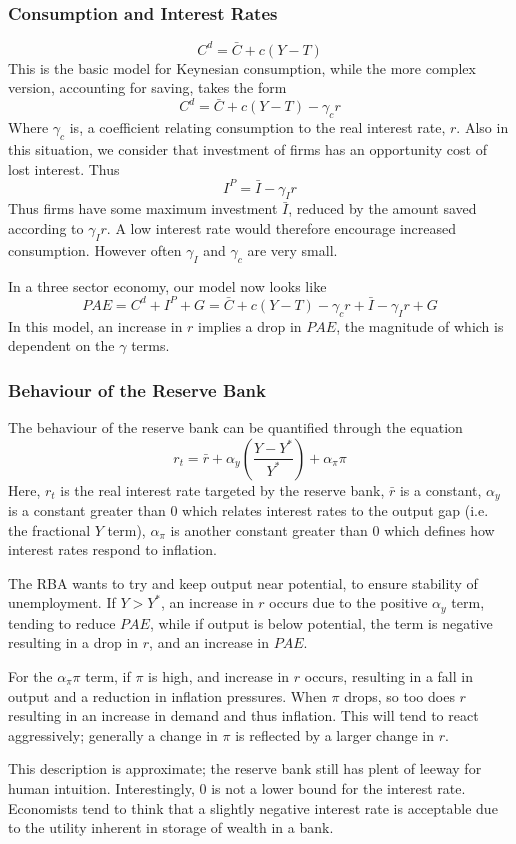 \documentclass[12pt]{report}
\begin{document}
\begin{flushleft}
\subsubsection*{Consumption and Interest Rates}

\[C^d = \bar{C} + c(Y - T)\]
This is the basic model for Keynesian consumption, while the more complex
version, accounting for saving, takes the form
\[C^d = \bar{C} + c(Y - T) - \gamma_cr\]
Where \(\gamma_c\) is, a coefficient relating consumption to the
real interest rate, \(r\). Also in this situation, we consider that investment
of firms has an opportunity cost of lost interest. Thus
\[I^P = \bar{I} - \gamma_Ir\]
Thus firms have some maximum investment \(\bar{I}\), reduced by the amount
saved according to \(\gamma_Ir\). A low interest rate would therefore encourage
increased consumption. However often \(\gamma_I\) and \(\gamma_c\) are very
small. \par
In a three sector economy, our model now looks like
\[PAE = C^d + I^P + G =\bar{C} + c(Y - T) -\gamma_cr + \bar{I} -\gamma_Ir + G\] 
In this model, an increase in \(r\) implies a drop in \(PAE\), the magnitude of
which is dependent on the \(\gamma\) terms.

\subsubsection*{Behaviour of the Reserve Bank}

The behaviour of the reserve bank can be quantified through the equation
\[r_t = \bar{r} + \alpha_y\left(\frac{Y - Y^*}{Y^*}\right) + \alpha_\pi\pi\]
Here, \(r_t\) is the real interest rate targeted by the reserve bank,
\(\bar{r}\) is a constant, \(\alpha_y\) is a constant greater than \(0\) which
relates interest rates to the output gap (i.e. the fractional \(Y\) term),
\(\alpha_\pi\) is another constant greater than \(0\) which defines how
interest rates respond to inflation. \par
The RBA wants to try and keep output near potential, to ensure stability of
unemployment. If \(Y > Y^*\), an increase in \(r\) occurs due to the positive
\(\alpha_y\) term, tending to reduce \(PAE\), while if output is below
potential, the term is negative resulting in a drop in \(r\), and an increase
in \(PAE\). \par
For the \(\alpha_\pi\pi\) term, if \(\pi\) is high, and increase in \(r\)
occurs, resulting in a fall in output and a reduction in inflation pressures.
When \(\pi\) drops, so too does \(r\) resulting in an increase in demand and
thus inflation. This will tend to react aggressively; generally a change in
\(\pi\) is reflected by a larger change in \(r\). \par
This description is approximate; the reserve bank still has plent of leeway
for human intuition. Interestingly, \(0\) is not a lower bound for the interest
rate. Economists tend to think that a slightly negative interest rate is
acceptable due to the utility inherent in storage of wealth in a bank.

\end{flushleft}
\end{document}

